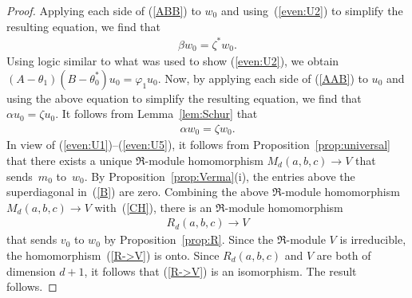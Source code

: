 \documentclass[11pt]{article}
\numberwithin{equation}{section}
\numberwithin{equation}{section}
\begin{document}
\begin{proof}
Applying each side of (\ref{ABB}) to $w_0$ and using~(\ref{even:U2}) to simplify the resulting equation, we find that
\begin{gather}\label{even:U4}
\beta w_0=\zeta^* w_0.
\end{gather}
Using logic similar to what was used to show (\ref{even:U2}), we obtain $(A-\theta_1)(B-\theta_0^*)u_0=\varphi_1 u_0$. Now, by applying each side of (\ref{AAB}) to $u_0$ and using the above equation to simplify the resulting equation, we find that $\alpha u_0=\zeta u_0$. It follows from Lemma~\ref{lem:Schur} that
\begin{gather}\label{even:U5}
\alpha w_0=\zeta w_0.
\end{gather}
In view of (\ref{even:U1})--(\ref{even:U5}), it follows from Proposition~\ref{prop:universal} that there exists a unique $\Re$-module homomorphism $M_d(a,b,c)\to V$ that sends~$m_0$ to~$w_0$. By Proposition~\ref{prop:Verma}(i), the entries above the superdiagonal in~(\ref{B}) are zero.
Combining the above $\Re$-module homomorphism \mbox{$M_d(a,b,c)\to V$} with~(\ref{CH}), there is an $\Re$-module homomorphism
\begin{gather}\label{R->V}
R_d(a,b,c)\to V
\end{gather}
that sends $v_0$ to $w_0$ by Proposition~\ref{prop:R}. Since the $\Re$-module $V$ is irreducible, the homomorphism~(\ref{R->V}) is onto. Since $R_d(a,b,c)$ and $V$ are both of dimension $d+1$, it follows that (\ref{R->V}) is an isomorphism. The result follows.
\end{proof}
\end{document}
